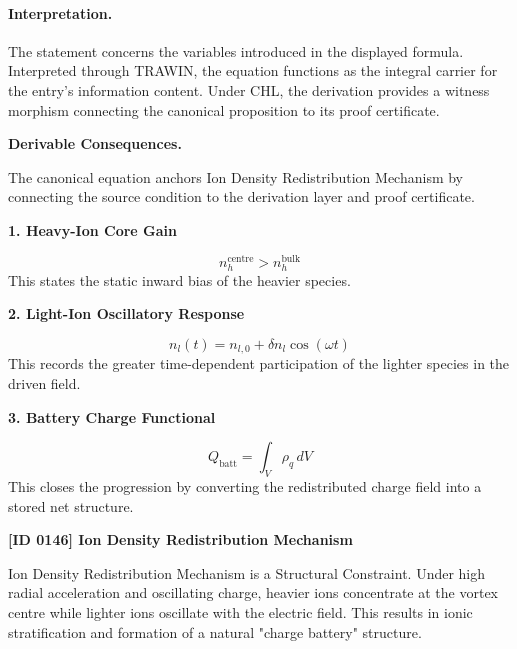 \paragraph{Interpretation.}
The statement concerns the variables introduced in the displayed formula. Interpreted through TRAWIN, the equation functions as the integral carrier for the entry’s information content. Under CHL, the derivation provides a witness morphism connecting the canonical proposition to its proof certificate.

\par\vspace{0.35em}
\noindent\textbf{Derivable Consequences.}\quad
\begingroup
\footnotesize
\raggedright
The canonical equation anchors Ion Density Redistribution Mechanism by connecting the source condition to the derivation layer and proof certificate.
\par\endgroup

\noindent\textbf{1. Heavy-Ion Core Gain}\par
\[
n_h^{\mathrm{centre}} > n_h^{\mathrm{bulk}}
\]
\noindent This states the static inward bias of the heavier species.\par
\noindent\textbf{2. Light-Ion Oscillatory Response}\par
\[
n_l(t)=n_{l,0}+\delta n_l \cos(\omega t)
\]
\noindent This records the greater time-dependent participation of the lighter species in the driven field.\par
\noindent\textbf{3. Battery Charge Functional}\par
\[
Q_{\mathrm{batt}}=\int_V \rho_q\, dV
\]
\noindent This closes the progression by converting the redistributed charge field into a stored net structure.\par

\clearpage
\noindent\textbf{[ID 0146] Ion Density Redistribution Mechanism}\par
\vspace{0.35em}
\begingroup\small
{}
Ion Density Redistribution Mechanism is a Structural Constraint. Under high radial acceleration and oscillating charge, heavier ions concentrate at the vortex centre while lighter ions oscillate with the electric field. This results in ionic stratification and formation of a natural "charge battery" structure.

